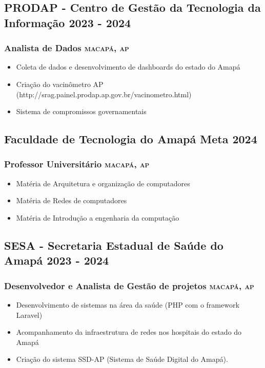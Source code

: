 \documentclass{article}
\newcommand{\rside}[1]{\hfill \normalfont\scshape\MakeLowercase{#1}}
\begin{document}
\subsection{PRODAP - Centro de Gestão da Tecnologia da Informação  \rside{2023 - 2024}}
\subsubsection{ Analista de Dados  \rside{Macapá, AP}}
\begin{itemize}
  \item Coleta de dados e desenvolvimento de dashboards do estado do Amapá
  \item Criação do vacinômetro AP (http://srag.painel.prodap.ap.gov.br/vacinometro.html)
  \item Sistema de compromissos governamentais
\end{itemize}

\subsection{Faculdade de Tecnologia do Amapá Meta   \rside{2024}}
\subsubsection{ Professor Universitário  \rside{Macapá, AP}}
\begin{itemize}
  \item Matéria de Arquitetura e organização de computadores
  \item Matéria de Redes de computadores
  \item Matéria de Introdução a engenharia da computação
\end{itemize}


\subsection{SESA - Secretaria Estadual de Saúde do Amapá \rside{2023 - 2024}}
\subsubsection{ Desenvolvedor e  Analista de Gestão de projetos  \rside{Macapá, AP}}
\begin{itemize}
  \item Desenvolvimento de sistemas na área da saúde (PHP com o framework Laravel)
  \item Acompanhamento da infraestrutura de redes nos hospitais do estado do Amapá
  \item Criação do sistema SSD-AP (Sistema de Saúde Digital do Amapá).
\end{itemize}
\end{document}
